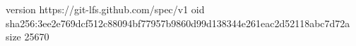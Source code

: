 version https://git-lfs.github.com/spec/v1
oid sha256:3ee2e769dcf512c88094bf77957b9860d99d138344e261eac2d52118abc7d72a
size 25670
